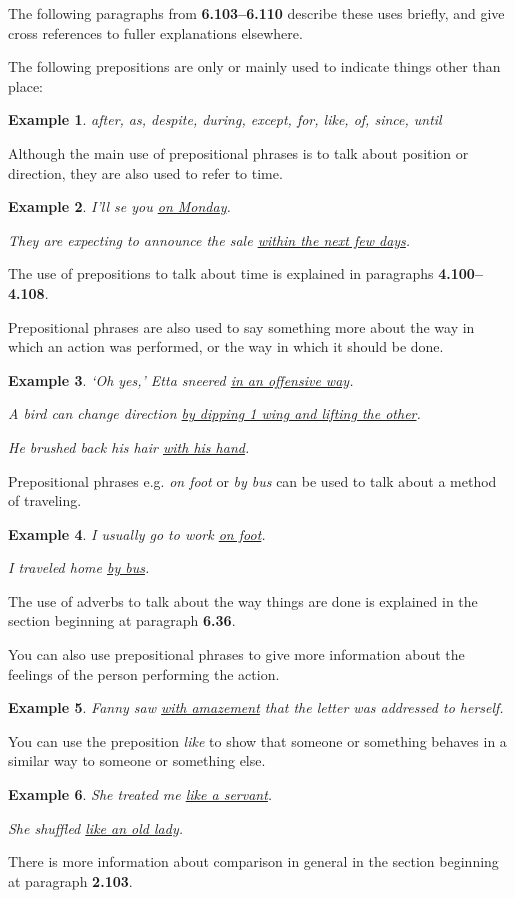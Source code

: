 \documentclass[oneside]{book}
\numberwithin{equation}{section}
\newtheorem{example}{Example}[section]
\begin{document}
The following paragraphs from \textbf{6.103--6.110} describe these uses briefly, and give cross references to fuller explanations elsewhere.

%
The following prepositions are only or mainly used to indicate things other than place:
\begin{example}
    after, as, despite, during, except, for, like, of, since, until
\end{example}
%
\noindent{} Although the main use of prepositional phrases is to talk about position or direction, they are also used to refer to time.
\begin{example}
    I'll se you \underline{on Monday}.
    
    They are expecting to announce the sale \underline{within the next few days}.
\end{example}
The use of prepositions to talk about time is explained in paragraphs \textbf{4.100--4.108}.

%
\noindent{} Prepositional phrases are also used to say something more about the way in which an action was performed, or the way in which it should be done.
\begin{example}
    `Oh yes,' Etta sneered \underline{in an offensive way}.
    
    A bird can change direction \underline{by dipping 1 wing and lifting the other}.
    
    He brushed back his hair \underline{with his hand}.
\end{example}
Prepositional phrases e.g. \textit{on foot} or \textit{by bus} can be used to talk about a method of traveling.
\begin{example}
    I usually go to work \underline{on foot}.
    
    I traveled home \underline{by bus}.
\end{example}
The use of adverbs to talk about the way things are done is explained in the section beginning at paragraph \textbf{6.36}.

%
\noindent{} You can also use prepositional phrases to give more information about the feelings of the person performing the action.
\begin{example}
    Fanny saw \underline{with amazement} that the letter was addressed to herself.
\end{example}
%
\noindent{} You can use the preposition \textit{like} to show that someone or something behaves in a similar way to someone or something else.
\begin{example}
    She treated me \underline{like a servant}.
    
    She shuffled \underline{like an old lady}.
\end{example}
There is more information about comparison in general in the section beginning at paragraph \textbf{2.103}.
\end{document}
